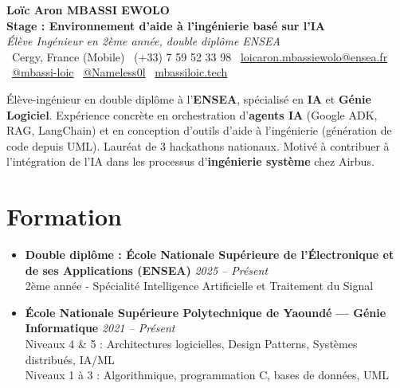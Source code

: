 ﻿\documentclass[a4paper,11pt]{article}
\begin{document}
\begin{center}
    {\Large \textbf{Loïc Aron MBASSI EWOLO}} \\ \vspace{4pt}
    \textbf{\large Stage : Environnement d'aide à l'ingénierie basé sur l'IA} \\
    \textit{\small Élève Ingénieur en 2ème année, double diplôme ENSEA} \\ \vspace{4pt}
    \small
    \faMapMarker\ Cergy, France (Mobile) \quad
    \faPhone\ (+33) 7 59 52 33 98 \quad
    \faEnvelope\ \href{mailto:loicaron.mbassiewolo@ensea.fr}{loicaron.mbassiewolo@ensea.fr} \\ \vspace{2pt}
    \faLinkedin\ \href{https://www.linkedin.com/in/mbassi-loic-3942a9246/}{@mbassi-loic} \quad
    \faGithub\ \href{https://github.com/Nameless0l}{@Nameless0l} \quad
    \faGlobe\ \href{https://mbassiloic.tech}{mbassiloic.tech}
\end{center}

\vspace{-8pt}

\noindent\small{Élève-ingénieur en double diplôme à l'\textbf{ENSEA}, spécialisé en \textbf{IA} et \textbf{Génie Logiciel}. 
Expérience concrète en orchestration d'\textbf{agents IA} (Google ADK, RAG, LangChain) et en conception d'outils d'aide à l'ingénierie (génération de code depuis UML). 
Lauréat de 3 hackathons nationaux. Motivé à contribuer à l'intégration de l'IA dans les processus d'\textbf{ingénierie système} chez Airbus.}

\vspace{4pt}

\section{Formation}
\begin{itemize}[leftmargin=*, label={.}, nosep]
    \item \textbf{Double diplôme : École Nationale Supérieure de l'Électronique et de ses Applications (ENSEA)} \hfill \textit{2025 -- Présent} \\
    \small{2ème année - Spécialité Intelligence Artificielle et Traitement du Signal}
    \vspace{2pt}
    \item \textbf{École Nationale Supérieure Polytechnique de Yaoundé — Génie Informatique} \hfill \textit{2021 -- Présent} \\
    \small{Niveaux 4 \& 5 : Architectures logicielles, Design Patterns, Systèmes distribués, IA/ML} \\
    \small{Niveaux 1 à 3 : Algorithmique, programmation C, bases de données, UML}
\end{itemize}
\end{document}
